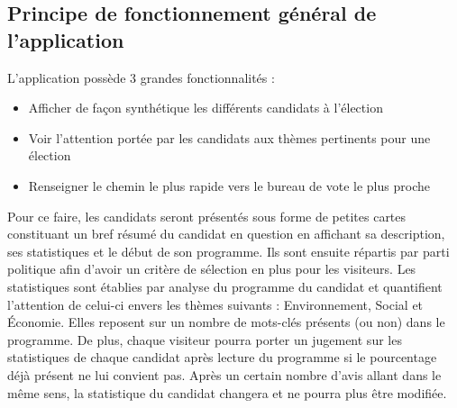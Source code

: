 \subsection{Principe de fonctionnement général de l'application}
\vskip 0.25cm
\noindent
L'application possède 3 grandes fonctionnalités :
\begin{itemize}
    \item Afficher de façon synthétique les différents candidats à l'élection
    \item Voir l'attention portée par les candidats aux thèmes pertinents pour une élection
    \item Renseigner le chemin le plus rapide vers le bureau de vote le plus proche
\end{itemize}
\vskip 0.25cm
\noindent
Pour ce faire, les candidats seront présentés sous forme de petites cartes constituant un bref résumé du candidat en question en affichant sa description, ses statistiques et le début de son programme. Ils sont ensuite répartis par parti politique afin d'avoir un critère de sélection en plus pour les visiteurs.
\vskip 0.25cm
\noindent
Les statistiques sont établies par analyse du programme du candidat et quantifient l'attention de celui-ci envers les thèmes suivants : Environnement, Social et Économie. Elles reposent sur un nombre de mots-clés présents (ou non) dans le programme.
\vskip 0.25cm
\noindent
De plus, chaque visiteur pourra porter un jugement sur les statistiques de chaque candidat après lecture du programme si le pourcentage déjà présent ne lui convient pas. Après un certain nombre d'avis allant dans le même sens, la statistique du candidat changera et ne pourra plus être modifiée.
\vskip 0.25cm

